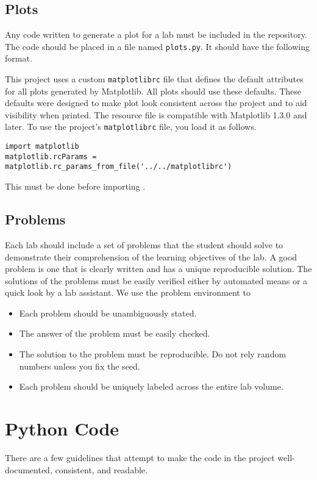 \subsection{Plots}
Any code written to generate a plot for a lab must be included in the repository.
The code should be placed in a file named \texttt{plots.py}.
It should have the following format.


This project uses a custom \texttt{matplotlibrc} file that defines the default attributes for all plots generated by Matplotlib.
All plots should use these defaults.
These defaults were designed to make plot look consistent across the project and to aid visibility when printed.
The resource file is compatible with Matplotlib 1.3.0 and later.
To use the project's \texttt{matplotlibrc} file, you load it as follows.
\begin{lstlisting}
import matplotlib
matplotlib.rcParams = matplotlib.rc_params_from_file('../../matplotlibrc')
\end{lstlisting}
This must be done before importing .

\subsection{Problems}
Each lab should include a set of problems that the student should solve to demonstrate their comprehension of the learning objectives of the lab.
A good problem is one that is clearly written and has a unique reproducible solution.
The solutions of the problems must be easily verified either by automated means or a quick look by a lab assistant.
We use the problem environment to 
\begin{itemize}
\item Each problem should be unambiguously stated.
\item The answer of the problem must be easily checked.
\item The solution to the problem must be reproducible.  Do not rely random numbers unless you fix the seed.
\item Each problem should be uniquely labeled across the entire lab volume.
\end{itemize}

\section{Python Code}
There are a few guidelines that attempt to make the code in the project well-documented, consistent, and readable.

